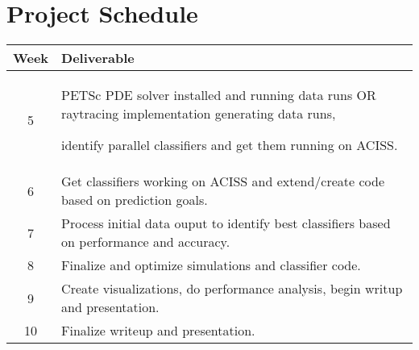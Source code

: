 \section{Project Schedule}

\begin{tabular}{c | p{14.2cm}}
Week & Deliverable\\
\hline
5 & PETSc PDE solver installed and running data runs OR raytracing implementation generating data runs, \par identify parallel classifiers and get them running on ACISS. \\ 
6 & Get classifiers working on ACISS and extend/create code based on prediction goals. \\ 
7 & Process initial data ouput to identify best classifiers based on performance and accuracy. \\ 
8 & Finalize and optimize simulations and classifier code.\\
9 & Create visualizations, do performance analysis, begin writup and presentation. \\
10 & Finalize writeup and presentation.\\
\end{tabular}
